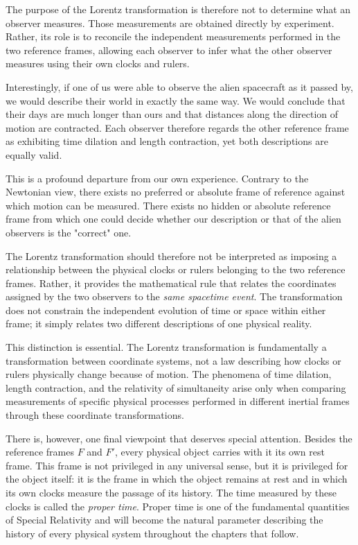 \documentclass[12pt]{article}
\begin{document}
The purpose of the Lorentz transformation is therefore not to determine what an
observer measures. Those measurements are obtained directly by experiment.
Rather, its role is to reconcile the independent measurements performed in the
two reference frames, allowing each observer to infer what the other observer
measures using their own clocks and rulers. \par

Interestingly, if one of us were able to observe the alien spacecraft as it
passed by, we would describe their world in exactly the same way. We would
conclude that their days are much longer than ours and that distances along the
direction of motion are contracted. Each observer therefore regards the other
reference frame as exhibiting time dilation and length contraction, yet both
descriptions are equally valid. \par

This is a profound departure from our own experience. Contrary to the
Newtonian view, there exists no preferred or absolute frame of reference against
which motion can be measured. There exists no hidden or absolute reference frame from which one could 
decide whether our description or that of the alien observers is the "correct" one. 
\par

The Lorentz transformation should therefore not be interpreted as imposing a
relationship between the physical clocks or rulers belonging to the two
reference frames. Rather, it provides the mathematical rule that relates the
coordinates assigned by the two observers to the \emph{same spacetime event}. 
The transformation does not constrain the
independent evolution of time or space within either frame; it simply
relates two different descriptions of one physical reality. \par

This distinction is essential. The Lorentz transformation is fundamentally a
transformation between coordinate systems, not a law describing how clocks
or rulers physically change because of motion. The phenomena of time
dilation, length contraction, and the relativity of simultaneity arise only
when comparing measurements of specific physical processes performed in
different inertial frames through these coordinate transformations. \par

 
There is, however, one final viewpoint that deserves special attention. Besides the reference frames
$F$ and $F'$, every physical object carries with it its own rest frame. This
frame is not privileged in any universal sense, but it is privileged for the
object itself: it is the frame in which the object remains at rest and in which
its own clocks measure the passage of its history. The time measured by these
clocks is called the \emph{proper time}. Proper time is one of the fundamental quantities of Special Relativity and 
will become the natural parameter describing the history of every physical system throughout the chapters that follow. \par
\end{document}

